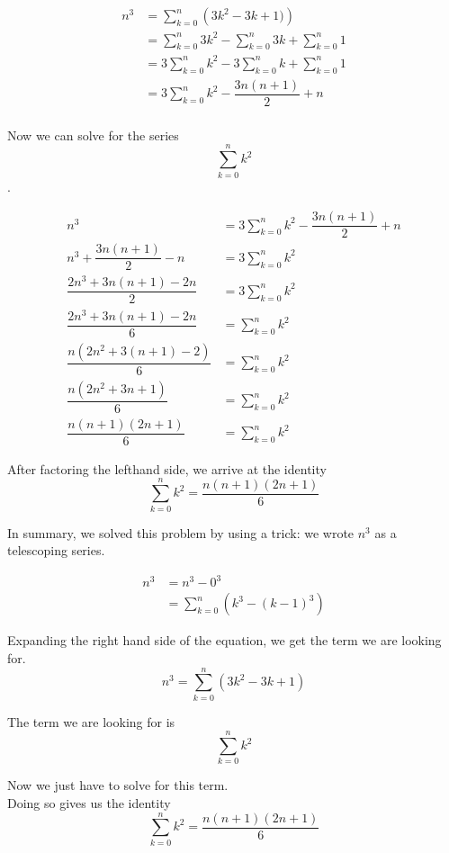 \documentclass{article}
\begin{document}
\begin{align*}
n^3 &= \sum_{k=0}^{n} \left( 3k^2 - 3k + 1) \right) \\
&= \sum_{k=0}^{n} 3k^2 - \sum_{k=0}^{n} 3k + \sum_{k=0}^{n} 1 \\
&= 3 \sum_{k=0}^{n} k^2 - 3 \sum_{k=0}^{n} k + \sum_{k=0}^{n} 1 \\
&= 3 \sum_{k=0}^{n} k^2 - \dfrac{3n(n+1)}{2} + n \\
\end{align*}

Now we can solve for the series $$\sum_{k=0}^{n} k^2$$.

\begin{align*}
n^3 &= 3 \sum_{k=0}^{n} k^2 - \dfrac{3n(n+1)}{2} + n \\
n^3 + \dfrac{3n(n+1)}{2} - n &= 3 \sum_{k=0}^{n} k^2 \\
\dfrac{2n^3 + 3n(n+1) - 2n}{2} &= 3 \sum_{k=0}^{n} k^2 \\
\dfrac{2n^3 + 3n(n+1) - 2n}{6} &= \sum_{k=0}^{n} k^2 \\
\dfrac{n(2n^2 + 3(n+1) - 2)}{6} &= \sum_{k=0}^{n} k^2 \\
\dfrac{n(2n^2 + 3n + 1)}{6} &= \sum_{k=0}^{n} k^2 \\
\dfrac{n(n+1)(2n+1)}{6} &= \sum_{k=0}^{n} k^2
\end{align*}

After factoring the lefthand side, we arrive at the identity $$\sum_{k=0}^{n} k^2 = \dfrac{n(n+1)(2n+1)}{6} $$

In summary, we solved this problem by using a trick: we wrote $n^3$ as a telescoping series.

\begin{align*}
n^3 &= n^3 - 0^3 \\
&= \sum_{k=0}^{n} \left( k^3 - (k-1)^3 \right)
\end{align*}

Expanding the right hand side of the equation, we get the term we are looking for. $$ n^3 = \sum_{k=0}^{n} \left( 3k^2 - 3k + 1 \right)  $$

The term we are looking for is $$ \sum_{k=0}^{n} k^2 $$

Now we just have to solve for this term. \\

Doing so gives us the identity $$\sum_{k=0}^{n} k^2 = \dfrac{n(n+1)(2n+1)}{6} $$
\end{document}
